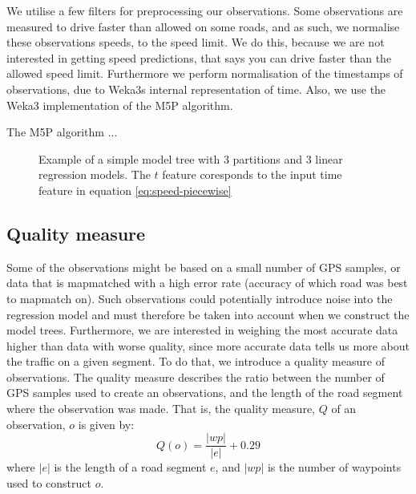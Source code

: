 We utilise a few filters for preprocessing our observations. Some observations are measured to drive faster than allowed on some roads, and as such, we normalise these observations speeds, to the speed limit. We do this, because we are not interested in getting speed predictions, that says you can drive faster than the allowed speed limit. Furthermore we perform normalisation of the timestamps of observations, due to Weka3s internal representation of time. Also, we use the Weka3 implementation of the M5P algorithm.

The M5P algorithm ...
\begin{figure}
	\centering
	\caption{Example of a simple model tree with 3 partitions and 3 linear regression models. The $t$ feature coresponds to the input time feature in equation \ref{eq:speed-piecewise}}
\end{figure}


\subsection{Quality measure}\label{quality-measure}
Some of the observations might be based on a small number of GPS samples, or data that is mapmatched with a high error rate (accuracy of which road was best to mapmatch on). Such observations could potentially introduce noise into the regression model and must therefore be taken into account when we construct the model trees. Furthermore, we are interested in weighing the most accurate data higher than data with worse quality, since more accurate data tells us more about the traffic on a given segment. To do that, we introduce a quality measure of observations. The quality measure describes the ratio between the number of GPS samples used to create an observations, and the length of the road segment where the observation was made. That is, the quality measure, $Q$ of an observation, $o$ is given by:
\begin{equation}
Q(o) = \frac{|wp|}{|e|}+0.29
\end{equation}
where $|e|$ is the length of a road segment $e$, and $|wp|$ is the number of waypoints used to construct $o$.
